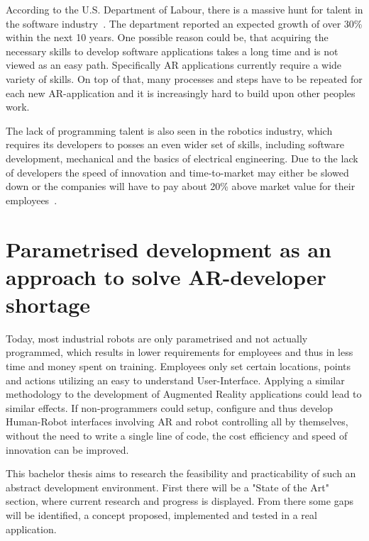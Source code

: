 According to the U.S. Department of Labour, there is a massive hunt for talent in the software industry~\cite{blsGov}. The department reported an expected growth of over 30\% within the next 10 years. One possible reason could be, that acquiring the necessary skills to develop software applications takes a long time and is not viewed as an easy path. Specifically AR applications currently require a wide variety of skills. On top of that, many processes and steps have to be repeated for each new AR-application and it is increasingly hard to build upon other peoples work.

The lack of programming talent is also seen in the robotics industry, which requires its developers to posses an even wider set of skills, including software development, mechanical and the basics of electrical engineering. Due to the lack of developers the speed of innovation and time-to-market may either be slowed down or the companies will have to pay about 20\% above market value for their employees~\cite{devShortageHackernoon}.

\section{Parametrised development as an approach to solve AR-developer shortage}
\label{Section:PARRHIApproach}
Today, most industrial robots are only parametrised and not actually programmed, which results in lower requirements for employees and thus in less time and money spent on training. Employees only set certain locations, points and actions utilizing an easy to understand User-Interface. Applying a similar methodology to the development of Augmented Reality applications could lead to similar effects. If non-programmers could setup, configure and thus develop Human-Robot interfaces involving AR and robot controlling all by themselves, without the need to write a single line of code, the cost efficiency and speed of innovation can be improved.

This bachelor thesis aims to research the feasibility and practicability of such an abstract development environment. First there will be a "State of the Art" section, where current research and progress is displayed. From there some gaps will be identified, a concept proposed, implemented and tested in a real application.



























